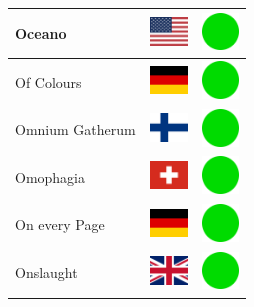 \documentclass[12pt, a4paper, twoside]{report}
\begin{document}
\begin{center}
\begin{longtable}{|p{5cm}|p{2cm}|p{2cm}|}
 Oceano                                                     & \includegraphics[width=1cm]{4x3/us} &   \includegraphics[width=1cm]{likes/y} \\ \hline
 Of Colours                                                 & \includegraphics[width=1cm]{4x3/de} &   \includegraphics[width=1cm]{likes/y} \\ \hline
 Omnium Gatherum                                            & \includegraphics[width=1cm]{4x3/fi} &   \includegraphics[width=1cm]{likes/y} \\ \hline
 Omophagia                                                  & \includegraphics[width=1cm]{4x3/ch} &   \includegraphics[width=1cm]{likes/y} \\ \hline
 On every Page                                              & \includegraphics[width=1cm]{4x3/de} &   \includegraphics[width=1cm]{likes/y} \\ \hline
 Onslaught                                                  & \includegraphics[width=1cm]{4x3/gb} &   \includegraphics[width=1cm]{likes/y} \\ \hline

\end{longtable}
\end{center}
\end{document}
